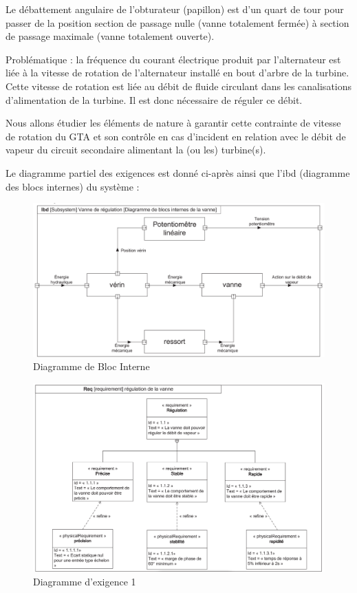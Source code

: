 Le débattement angulaire de l’obturateur (papillon) est d’un quart de tour pour passer de la position section de passage nulle (vanne totalement fermée) à section de passage maximale (vanne totalement ouverte).

Problématique : la fréquence du courant électrique produit par l’alternateur est liée à la vitesse de rotation de l'alternateur installé en bout d'arbre de la turbine. Cette vitesse de rotation est liée au débit de fluide circulant dans les canalisations d'alimentation de la turbine. Il est donc nécessaire de réguler ce débit.

Nous allons étudier les éléments de nature à garantir cette contrainte de vitesse de rotation du GTA et son contrôle en cas d'incident en relation avec le débit de vapeur du circuit secondaire alimentant la (ou les) turbine(s).

\newpage

Le diagramme partiel des exigences est donné ci-après ainsi que l’ibd (diagramme des blocs internes) du système :

\begin{figure}[ht!]
\begin{center}
 \includegraphics[width=0.5\linewidth]{img/fig05}
\end{center}
\caption{Diagramme de Bloc Interne}
\label{fig05}
\end{figure}

\begin{figure}[ht!]
\begin{center}
 \includegraphics[width=0.55\linewidth]{img/fig06}
\end{center}
\caption{Diagramme d'exigence 1}
\label{fig06}
\end{figure}

